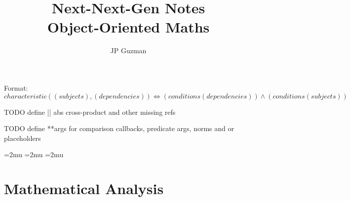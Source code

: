 \documentclass[a4paper]{article}
\title{Next-Next-Gen Notes \\
\large Object-Oriented Maths}
\author{JP Guzman}
\begin{document}
\maketitle
\allowdisplaybreaks

Format: $characteristic((subjects), (dependencies)) \iff (conditions(dependencies)) \land (conditions(subjects))$

TODO define || abs  cross-product and other missing refs

TODO define **args for comparison callbacks, predicate args, norms and or placeholders

\thinmuskip=2mu %
\medmuskip=2mu %
\thickmuskip=2mu %
\setlength{\belowdisplayskip}{0pt} \setlength{\belowdisplayshortskip}{0pt}
\setlength{\abovedisplayskip}{0pt} \setlength{\abovedisplayshortskip}{0pt}

\section{Mathematical Analysis}
\end{document}
